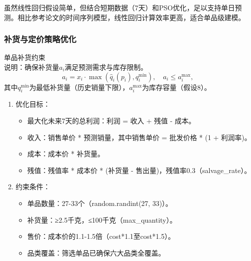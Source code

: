 \documentclass{cumcmthesis} %
\begin{document}
虽然线性回归假设简单，但结合短期数据（7天）和PSO优化，足以支持单日预测。相比参考论文的时间序列模型，线性回归计算效率更高，适合单品级建模。


\subsubsection{补货与定价策略优化}
单品补货约束 \\
   说明：确保补货量$a_i$满足预测需求与库存限制。
   \begin{equation}
   a_i = x_i \cdot \max(\hat{q}_i(p_i), q_i^{\text{min}}), \quad a_i \leq a_i^{\text{max}},
   \end{equation}
   其中$q_i^{\text{min}}$为最低补货量（历史销量下限），$a_i^{\text{max}}$为库存容量（假设8）。


\begin{enumerate}
    \item 优化目标：
    \begin{itemize}
        \item 最大化未来7天的总利润：利润 = 收入 + 残值 - 成本。
        \item 收入：销售单价 * 预测销量，其中销售单价 = 批发价格 * (1 + 利润率)。
        \item 成本：成本价 * 补货量。
        \item 残值：残值率 * 成本价 * (补货量 - 售出量)，残值率0.3（salvage\_rate）。
    \end{itemize}
    \item 约束条件：
    \begin{itemize}
        \item 单品数量：27-33个（random.randint(27, 33)）。
        \item 补货量：≥2.5千克，≤100千克（max\_quantity）。
        \item 售价：成本价的1.1-1.5倍（cost*1.1至cost*1.5）。
        \item 品类覆盖：筛选单品已确保六大品类全覆盖。
    \end{itemize}


\end{enumerate}
\end{document}
